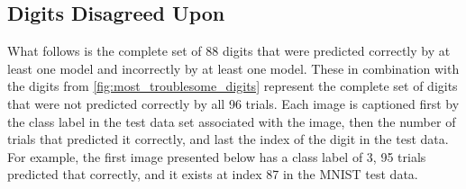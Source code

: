 \documentclass{article}
\begin{document}
\subsection{Digits Disagreed Upon}

What follows is the complete set of 88 digits that were predicted correctly by at least one model and incorrectly by at least one model.  These in combination with the digits from \autoref{fig:most_troublesome_digits} represent the complete set of digits that were not predicted correctly by all 96 trials.  Each image is captioned first by the class label in the test data set associated with the image, then the number of trials that predicted it correctly, and last the index of the digit in the test data. For example, the first image presented below has a class label of 3, 95 trials predicted that correctly, and it exists at index 87 in the MNIST test data.

\vspace{0.15in}
\end{document}
